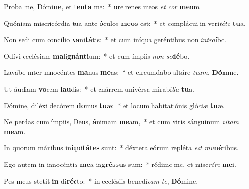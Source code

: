 \item Proba me, Dómi\textbf{ne}, et \textbf{ten}\textbf{ta} me:~* ure renes meos \textit{et} \textit{cor} \textbf{me}um.
\item Quóniam misericórdia tua ante \textbf{ó}culos \textbf{me}\textbf{os} est:~* et complácui in veri\textit{tá}\textit{te} \textbf{tu}a.
\item Non sedi cum concílio \textbf{va}ni\textbf{tá}tis:~* et cum iníqua geréntibus non \textit{in}\textit{tro}\textbf{í}bo.
\item Odívi ecclésiam \textbf{ma}li\textbf{gnán}\textbf{ti}um:~* et cum ímpiis \textit{non} \textit{se}\textbf{dé}bo.
\item Lavábo inter innocéntes \textbf{ma}nus \textbf{me}as:~* et circúmdabo altáre \textit{tu}\textit{um}, \textbf{Dó}mine.
\item Ut áudiam \textbf{vo}cem \textbf{lau}dis:~* et enárrem univérsa mirabí\textit{li}\textit{a} \textbf{tu}a.
\item Dómine, diléxi decórem \textbf{do}mus \textbf{tu}æ:~* et locum habitatiónis gló\textit{ri}\textit{æ} \textbf{tu}æ.
\item Ne perdas cum ímpiis, Deus, \textbf{á}nimam \textbf{me}am,~* et cum viris sánguinum \textit{vi}\textit{tam} \textbf{me}am.
\item In quorum mánibus in\textbf{i}qui\textbf{tá}\textbf{tes} sunt:~* déxtera eórum repléta \textit{est} \textit{mu}\textbf{né}ribus.
\item Ego autem in innocéntia \textbf{me}a in\textbf{grés}\textbf{sus} sum:~* rédime me, et mise\textit{ré}\textit{re} \textbf{me}i.
\item Pes meus stetit \textbf{in} di\textbf{réc}to:~* in ecclésiis benedí\textit{cam} \textit{te}, \textbf{Dó}mine.

